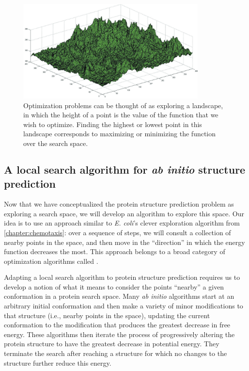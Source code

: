 \begin{figure}[h]
	\centering
	\mySfFamily
	\includegraphics[width = 0.85\textwidth]{../images_CMYK/energy_landscape}
	\caption{Optimization problems can be thought of as exploring a landscape, in which the height of a point is the value of the function that we wish to optimize. Finding the highest or lowest point in this landscape corresponds to maximizing or minimizing the function over the search space.}
	\label{fig:energy_landscape}
\end{figure}

\FloatBarrier
{}
\subsection{A local search algorithm for \textit{ab initio} structure prediction}

Now that we have conceptualized the protein structure prediction problem as exploring a search space, we will develop an algorithm to explore this space. Our idea is to use an approach similar to \textit{E. coli}'s clever exploration algorithm from \autoref{chapter:chemotaxis}: over a sequence of steps, we will consult a collection of nearby points in the space, and then move in the ``direction'' in which the energy function decreases the most. This approach belongs to a broad category of optimization algorithms called .

Adapting a local search algorithm to protein structure prediction requires us to develop a notion of what it means to consider the points ``nearby'' a given conformation in a protein search space. Many \textit{ab initio} algorithms start at an arbitrary initial conformation and then make a variety of minor modifications to that structure (i.e., nearby points in the space), updating the current conformation to the modification that produces the greatest decrease in free energy. These algorithms then iterate the process of progressively altering the protein structure to have the greatest decrease in potential energy. They terminate the search after reaching a structure for which no changes to the structure further reduce this energy.


